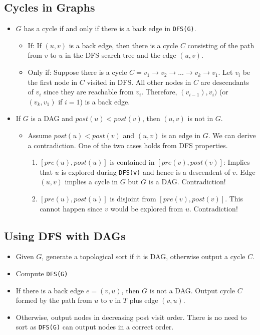 \documentclass[12pt]{article}
\begin{document}
\subsection{Cycles in Graphs}
\begin{itemize}
    \item $G$ has a cycle if and only if there is a back edge in \texttt{DFS(G)}.
    \begin{itemize}
        \item If: If $(u, v)$ is a back edge, then there is a cycle $C$ consisting of the path from $v$ to $u$ in the DFS search tree and the edge $(u, v)$.
        \item Only if: Suppose there is a cycle $C = v_1 \rightarrow v_2 \rightarrow ... \rightarrow v_k \rightarrow v_1$. Let $v_i$ be the first node in $C$ visited in DFS. All other nodes in $C$ are descendants of $v_i$ since they are reachable from $v_i$. Therefore, $(v_{i - 1}), v_i)$ (or $(v_k, v_1)$ if $i = 1$) is a back edge.
    \end{itemize}
    \item If $G$ is a DAG and $post(u) < post(v)$, then $(u, v)$ is not in $G$.
    \begin{itemize}
        \item Assume $post(u) < post(v)$ and $(u, v)$ is an edge in $G$. We can derive a contradiction. One of the two cases holds from DFS properties.
        \begin{enumerate}
            \item $[pre(u), post(u)]$ is contained in $[pre(v), post(v)]$: Implies that $u$ is explored during \texttt{DFS(v)} and hence is a descendent of $v$. Edge $(u, v)$ implies a cycle in $G$ but $G$ is a DAG. Contradiction!
            \item $[pre(u), post(u)]$ is disjoint from $[pre(v), post(v)]$. This cannot happen since $v$ would be explored from $u$. Contradiction!
        \end{enumerate}
    \end{itemize}
\end{itemize}

\subsection{Using DFS with DAGs}
\begin{itemize}
    \item Given $G$, generate a topological sort if it is DAG, otherwise output a cycle $C$.
    \item Compute \texttt{DFS(G)}
    \item If there is a back edge $e = (v, u)$, then $G$ is not a DAG. Output cycle $C$ formed by the path from $u$ to $v$ in $T$ plus edge $(v, u)$.
    \item Otherwise, output nodes in decreasing post visit order. There is no need to sort as \texttt{DFS(G)} can output nodes in a correct order.
\end{itemize}
\end{document}
